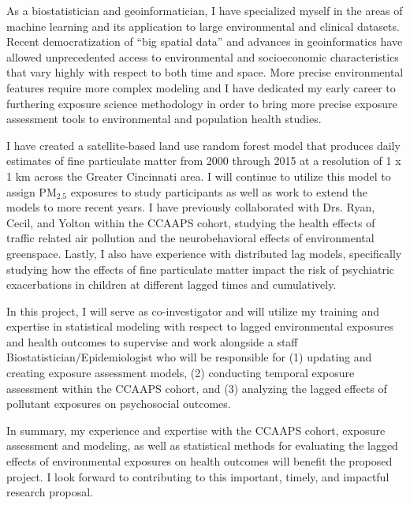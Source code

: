 \documentclass{nihbiosketch}
\begin{document}
\begin{statement}

As a biostatistician and geoinformatician, I have specialized myself in the
areas of machine learning and its application to large environmental and
clinical datasets. Recent democratization of “big spatial data” and advances in
geoinformatics have allowed unprecedented access to environmental and
socioeconomic characteristics that vary highly with respect to both time and
space. More precise environmental features require more complex modeling and I
have dedicated my early career to furthering exposure science methodology in
order to bring more precise exposure assessment tools to environmental and
population health studies.

I have created a satellite-based land use random forest model
that produces daily estimates of fine particulate matter from 2000 through 2015 at a
resolution of 1 x 1 km across the Greater Cincinnati area.  I will continue to
utilize this model to assign PM$_{2.5}$ exposures to study
participants as well as work to extend the
models to more recent years. I have previously collaborated with Drs. Ryan, Cecil, and Yolton
within the CCAAPS cohort, studying the health effects of traffic related air
pollution and the neurobehavioral effects of environmental greenspace.  Lastly, I also have experience with distributed lag models, specifically studying how
the effects of fine particulate matter impact the risk of psychiatric
exacerbations in children at different lagged times and cumulatively.

In this project, I will serve as co-investigator and will utilize my training and expertise in statistical modeling
with respect to lagged environmental exposures and health outcomes to supervise
and work alongside a staff Biostatistician/Epidemiologist who will be responsible for (1) updating and creating
exposure assessment models, (2) conducting temporal exposure assessment within the
CCAAPS cohort, and (3) analyzing the lagged effects of pollutant exposures on
psychosocial outcomes.

In summary, my experience and expertise with the CCAAPS cohort, exposure assessment and
modeling, as well as statistical methods for evaluating the lagged effects of
environmental exposures on health outcomes will benefit the proposed project. I
look forward to contributing to this important, timely, and impactful
research proposal.\\

  \begin{enumerate}


\end{enumerate}
\end{statement}
\end{document}
